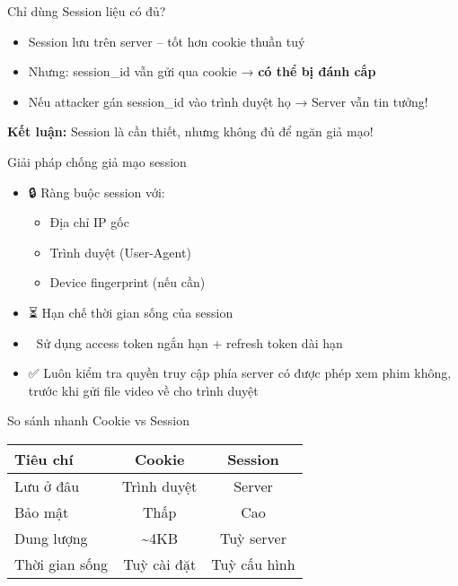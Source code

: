 \documentclass[aspectratio=169]{beamer}
\begin{document}
\begin{frame}{Chỉ dùng Session liệu có đủ?}
\begin{itemize}
  \item Session lưu trên server – tốt hơn cookie thuần tuý
  \item Nhưng: session\_id vẫn gửi qua cookie → \textbf{có thể bị đánh cắp}
  \item Nếu attacker gán session\_id vào trình duyệt họ → Server vẫn tin tưởng!
\end{itemize}

\vspace{1em}
\textbf{Kết luận:} Session là cần thiết, nhưng \alert{không đủ} để ngăn giả mạo!
\end{frame}

\begin{frame}{Giải pháp chống giả mạo session}
\begin{itemize}
  \item 🔒 Ràng buộc session với:
  \begin{itemize}
    \item Địa chỉ IP gốc
    \item Trình duyệt (User-Agent)
    \item Device fingerprint (nếu cần)
  \end{itemize}

  \item ⏳ Hạn chế thời gian sống của session
  \item 🔁 Sử dụng access token ngắn hạn + refresh token dài hạn
  \item ✅ Luôn kiểm tra quyền truy cập phía server có được phép xem phim không, trước khi gửi file video về cho trình duyệt
\end{itemize}
\end{frame}

\begin{frame}{So sánh nhanh Cookie vs Session}
  \begin{tabular}{|l|c|c|}
    \hline
    \textbf{Tiêu chí} & \textbf{Cookie} & \textbf{Session} \\
    \hline
    Lưu ở đâu         & Trình duyệt     & Server \\
    \hline
    Bảo mật           & Thấp            & Cao \\
    \hline
    Dung lượng        & \textasciitilde 4KB & Tuỳ server \\
    \hline
    Thời gian sống    & Tuỳ cài đặt     & Tuỳ cấu hình \\
    \hline
  \end{tabular}
\end{frame}
\end{document}
